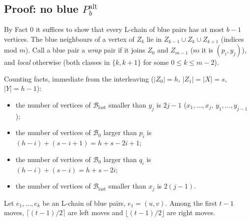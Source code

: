 \documentclass[11pt]{article}
\newcommand{\Palt}[1]{P_{#1}^{\mathrm{alt}}}
\newcommand{\Bfirst}{\mathcal{B}_0}
\newcommand{\Blast}{\mathcal{B}_{\mathrm{last}}}
\theoremstyle{plain}
\theoremstyle{remark}
\begin{document}
\subsection{Proof: no blue $\Palt{b}$}

By Fact 0 it suffices to show that every L-chain of blue pairs has at most $b-1$ vertices. The blue neighbours of a
vertex of $Z_k$ lie in $Z_{k-1} \cup Z_k \cup Z_{k+1}$ (indices mod $m$). Call a blue pair a \emph{wrap} pair if
it joins $Z_0$ and $Z_{m-1}$ (so it is $(p_i, y_j)$), and \emph{local} otherwise (both classes in $\{k, k+1\}$ for
some $0 \leq k \leq m-2$).

Counting facts, immediate from the interleaving ($|Z_0| = h$, $|Z_1| = |X| = s$, $|Y| = h-1$):
\begin{itemize}
  \item[(P1)] the number of vertices of $\Blast$ smaller than $y_j$ is $2j-1$ ($x_1, \dots, x_j$,
  $y_1, \dots, y_{j-1}$);
  \item[(P2)] the number of vertices of $\Bfirst$ larger than $p_i$ is $(h-i) + (s-i+1) = h+s-2i+1$;
  \item[(P3)] the number of vertices of $\Bfirst$ larger than $q_i$ is $(h-i) + (s-i) = h+s-2i$;
  \item[(P4)] the number of vertices of $\Blast$ smaller than $x_j$ is $2(j-1)$.
\end{itemize}

Let $e_1, \dots, e_k$ be an L-chain of blue pairs, $e_1 = (u, v)$. Among the first $t-1$ moves,
$\lceil (t-1)/2 \rceil$ are left moves and $\lfloor (t-1)/2 \rfloor$ are right moves.
\end{document}
